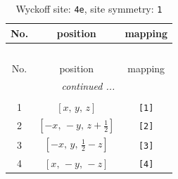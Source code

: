 \documentclass[fleqn,8pt]{jsarticle}
\begin{document}
\begin{longtable}{ccc}
\caption{Wyckoff site: {\tt 4e}, site symmetry: {\tt 1}}
 \\
 \hline \hline
No. & position & mapping \\ \hline \endfirsthead

\multicolumn{2}{l}{\tablename\ \thetable{}} \\
 \hline \hline
No. & position & mapping \\ \hline \endhead

 \hline \hline
\multicolumn{2}{r}{\footnotesize\it continued ...} \\ \endfoot

 \hline \hline
\multicolumn{2}{r}{} \\ \endlastfoot

1 & $\left[ x,\, y,\, z \right]$ & {\tt [1]} \\ \hline
2 & $\left[ - x,\, - y,\, z + \frac{1}{2} \right]$ & {\tt [2]} \\ \hline
3 & $\left[ - x,\, y,\, \frac{1}{2} - z \right]$ & {\tt [3]} \\ \hline
4 & $\left[ x,\, - y,\, - z \right]$ & {\tt [4]} \\
\end{longtable}
\end{document}
